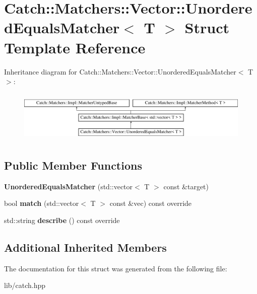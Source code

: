 \hypertarget{struct_catch_1_1_matchers_1_1_vector_1_1_unordered_equals_matcher}{}\section{Catch\+:\+:Matchers\+:\+:Vector\+:\+:Unordered\+Equals\+Matcher$<$ T $>$ Struct Template Reference}
\label{struct_catch_1_1_matchers_1_1_vector_1_1_unordered_equals_matcher}
Inheritance diagram for Catch\+:\+:Matchers\+:\+:Vector\+:\+:Unordered\+Equals\+Matcher$<$ T $>$\+:\begin{figure}[H]
\begin{center}
\leavevmode
\includegraphics[height=2.492581cm]{struct_catch_1_1_matchers_1_1_vector_1_1_unordered_equals_matcher}
\end{center}
\end{figure}
\subsection*{Public Member Functions}
\begin{DoxyCompactItemize}
\item 
\mbox{\label{struct_catch_1_1_matchers_1_1_vector_1_1_unordered_equals_matcher_a525905639b2b15b52ddb0bf14bfa19da}} 
{\bfseries Unordered\+Equals\+Matcher} (std\+::vector$<$ T $>$ const \&target)
\item 
\mbox{\label{struct_catch_1_1_matchers_1_1_vector_1_1_unordered_equals_matcher_a3ccdd9dd2cd8bdbb8bb121acbb9cb358}} 
bool {\bfseries match} (std\+::vector$<$ T $>$ const \&vec) const override
\item 
\mbox{\label{struct_catch_1_1_matchers_1_1_vector_1_1_unordered_equals_matcher_a7202d811200317abc58c844f663823df}} 
std\+::string {\bfseries describe} () const override
\end{DoxyCompactItemize}
\subsection*{Additional Inherited Members}


The documentation for this struct was generated from the following file\+:\begin{DoxyCompactItemize}
\item 
lib/catch.\+hpp\end{DoxyCompactItemize}
